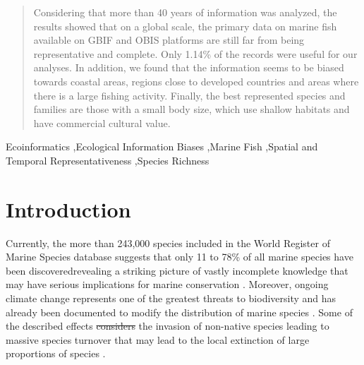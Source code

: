 \documentclass[12pt,authoryear]{elsarticle}
\providecommand{\DIFaddtex}[1]{{\protect\color{blue}\uwave{#1}}} %
\providecommand{\DIFdeltex}[1]{{\protect\color{red}\sout{#1}}}                      %
\providecommand{\DIFaddbegin}{} %
\providecommand{\DIFaddend}{} %
\providecommand{\DIFdelbegin}{} %
\providecommand{\DIFdelend}{} %
\providecommand{\DIFadd}[1]{\texorpdfstring{\DIFaddtex{#1}}{#1}} %
\providecommand{\DIFdel}[1]{\texorpdfstring{\DIFdeltex{#1}}{}} %
\begin{document}
\begin{frontmatter}
\begin{abstract}
Considering that more than 40 years of information was analyzed, the results showed that on a global scale, the primary data on marine fish available on GBIF and OBIS platforms are still far from being representative and complete. Only 1.14\% of the records were useful for our analyses. In addition, we found that the information seems to be biased towards coastal areas, regions close to developed countries and areas where there is a large fishing activity. Finally, the best represented species and families are those with a small body size, which use shallow habitats and have commercial cultural value.

\end{abstract}

\begin{keyword}
Ecoinformatics \sep Ecological Information Biases \sep Marine Fish \sep   Spatial and Temporal Representativeness \sep Species Richness
\end{keyword}

\end{frontmatter}
\onehalfspacing
\linenumbers
\section{Introduction}

Currently, the more than 243,000 species included in the World Register of Marine Species database \citep{worms2022} suggests that only 11 to 78\% of all marine species have been discovered\DIFaddbegin \DIFadd{, }\DIFaddend revealing a striking picture of vastly incomplete knowledge that may have serious implications for marine conservation \citep{luypaert2020}.
Moreover, ongoing climate change represents one of the greatest threats to biodiversity \citep{malhi2020climate, turner2020climate} and has already been documented to modify the distribution of marine species \citep{lenoir2020species}. Some of the described effects \DIFdelbegin \DIFdel{considers }\DIFdelend \DIFaddbegin \DIFadd{includes }\DIFaddend the invasion of non-native species leading to massive species turnover that may lead to the local extinction of large proportions of species \citep{cheung2009}. 
\end{document}

